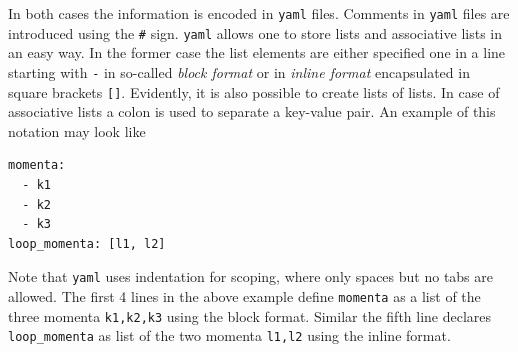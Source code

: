 \documentclass[a4paper,12pt]{scrartcl}
\newcommand*{\yaml}{\texttt{yaml}}
\begin{document}
In both cases the information is encoded in \yaml{} files.
Comments in \yaml{} files are introduced using the \texttt{\#}
sign. \yaml{} allows one to store lists and associative
lists in an easy way. In the former case the list elements are either specified
one in
a line starting with \texttt{-} in so-called \textit{block format}
or in \textit{inline format} encapsulated in square
brackets \texttt{[]}. Evidently, it is also possible to create lists
of lists. In case of associative lists a colon is used to separate a key-value pair.
An example of this notation may look like
\begin{verbatim}
momenta:
  - k1
  - k2
  - k3
loop_momenta: [l1, l2]
\end{verbatim}
Note that \yaml{} uses indentation for scoping, where only
spaces but no tabs are allowed.  The first 4 lines in the
above example define \texttt{momenta} as a list of the three momenta
\texttt{k1,k2,k3} using the block format. Similar the fifth line
declares \texttt{loop\_momenta} as list of the two momenta
\texttt{l1,l2} using the inline format.
\end{document}
